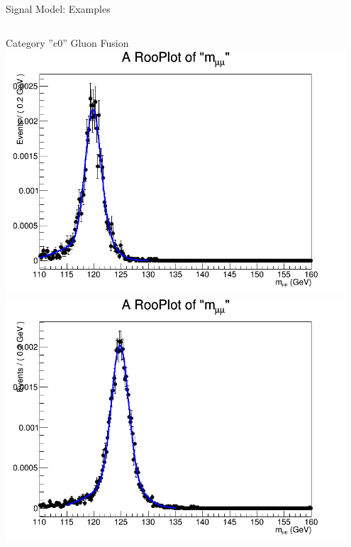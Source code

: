 \documentclass[pdf, 9pt]{beamer}
\begin{document}
  \begin{frame}{Signal Model: Examples}
    \vspace{-0.7cm}
    \begin{columns}[T]
      \begin{column}{0.33\textwidth}
        \begin{center}
          \tiny{Category ''c0'' Gluon Fusion}\\
          \includegraphics[width=0.95\textwidth, height=0.3\textheight]{figs/higgs/signalmodel/bdt/bdt_110to160_withSys/signalFit__c0__120__GluGlu__TripleGaus__default.png}\\
          \includegraphics[width=0.95\textwidth, height=0.3\textheight]{figs/higgs/signalmodel/bdt/bdt_110to160_withSys/signalFit__c0__125__GluGlu__TripleGaus__default.png}\\

\end{center}
\end{column}
\end{columns}
\end{frame}
\end{document}
